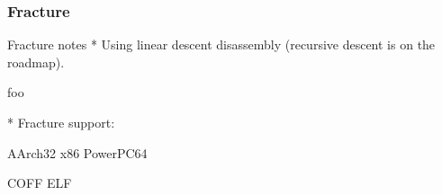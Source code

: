 
\subsubsection{Fracture}

Fracture notes
    * Using linear descent disassembly (recursive descent is on the roadmap).

foo \cite{fracture}

* Fracture support:

AArch32
x86
PowerPC64

COFF
ELF
